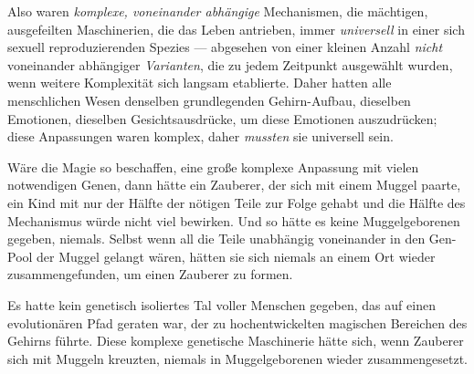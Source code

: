 Also waren \emph{komplexe, voneinander abhängige} Mechanismen, die mächtigen, ausgefeilten Maschinerien, die das Leben antrieben, immer \emph{universell} in einer sich sexuell reproduzierenden Spezies — abgesehen von einer kleinen Anzahl \emph{nicht} voneinander abhängiger \emph{Varianten}, die zu jedem Zeitpunkt ausgewählt wurden, wenn weitere Komplexität sich langsam etablierte. Daher hatten alle menschlichen Wesen denselben grundlegenden Gehirn-Aufbau, dieselben Emotionen, dieselben Gesichtsausdrücke, um diese Emotionen auszudrücken; diese Anpassungen waren komplex, daher \emph{mussten} sie universell sein.

Wäre die Magie so beschaffen, eine große komplexe Anpassung mit vielen notwendigen Genen, dann hätte ein Zauberer, der sich mit einem Muggel paarte, ein Kind mit nur der Hälfte der nötigen Teile zur Folge gehabt und die Hälfte des Mechanismus würde nicht viel bewirken. Und so hätte es keine Muggelgeborenen gegeben, niemals. Selbst wenn all die Teile unabhängig voneinander in den Gen-Pool der Muggel gelangt wären, hätten sie sich niemals an einem Ort wieder zusammengefunden, um einen Zauberer zu formen.

Es hatte kein genetisch isoliertes Tal voller Menschen gegeben, das auf einen evolutionären Pfad geraten war, der zu hochentwickelten magischen Bereichen des Gehirns führte. Diese komplexe genetische Maschinerie hätte sich, wenn Zauberer sich mit Muggeln kreuzten, niemals in Muggelgeborenen wieder zusammengesetzt.

